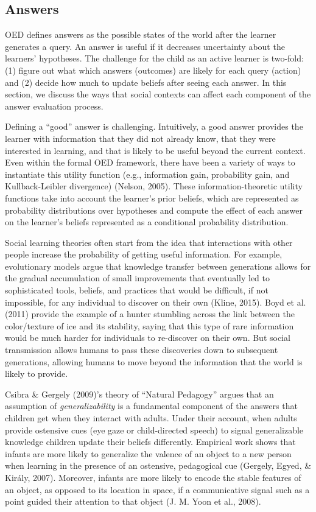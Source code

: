 \documentclass[oneside]{report}
\begin{document}
\subsection{Answers}\label{answers}

OED defines answers as the possible states of the world after the
learner generates a query. An answer is useful if it decreases
uncertainty about the learners' hypotheses. The challenge for the child
as an active learner is two-fold: (1) figure out what which answers
(outcomes) are likely for each query (action) and (2) decide how much to
update beliefs after seeing each answer. In this section, we discuss the
ways that social contexts can affect each component of the answer
evaluation process.

Defining a ``good'' answer is challenging. Intuitively, a good answer
provides the learner with information that they did not already know,
that they were interested in learning, and that is likely to be useful
beyond the current context. Even within the formal OED framework, there
have been a variety of ways to instantiate this utility function (e.g.,
information gain, probability gain, and Kullback-Leibler divergence)
(Nelson, 2005). These information-theoretic utility functions take into
account the learner's prior beliefs, which are represented as
probability distributions over hypotheses and compute the effect of each
answer on the learner's beliefs represented as a conditional probability
distribution.

Social learning theories often start from the idea that interactions
with other people increase the probability of getting useful
information. For example, evolutionary models argue that knowledge
transfer between generations allows for the gradual accumulation of
small improvements that eventually led to sophisticated tools, beliefs,
and practices that would be difficult, if not impossible, for any
individual to discover on their own (Kline, 2015). Boyd et al. (2011)
provide the example of a hunter stumbling across the link between the
color/texture of ice and its stability, saying that this type of rare
information would be much harder for individuals to re-discover on their
own. But social transmission allows humans to pass these discoveries
down to subsequent generations, allowing humans to move beyond the
information that the world is likely to provide.

Csibra \& Gergely (2009)'s theory of ``Natural Pedagogy'' argues that an
assumption of \emph{generalizability} is a fundamental component of the
answers that children get when they interact with adults. Under their
account, when adults provide ostensive cues (eye gaze or child-directed
speech) to signal generalizable knowledge children update their beliefs
differently. Empirical work shows that infants are more likely to
generalize the valence of an object to a new person when learning in the
presence of an ostensive, pedagogical cue (Gergely, Egyed, \& Király,
2007). Moreover, infants are more likely to encode the stable features
of an object, as opposed to its location in space, if a communicative
signal such as a point guided their attention to that object (J. M. Yoon
et al., 2008).
\end{document}

